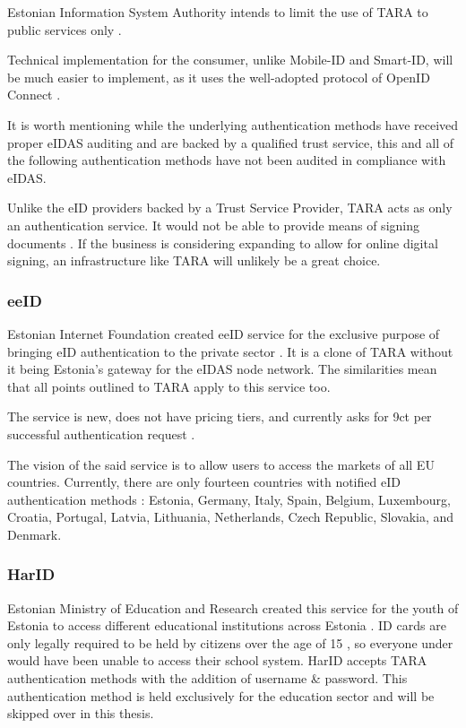 Estonian Information System Authority intends to limit the use of TARA to public services only \cite{tara-business}.

Technical implementation for the consumer, unlike Mobile-ID and Smart-ID, will be much easier to implement, as it uses the well-adopted protocol of OpenID Connect \cite{tara-technical, oidc}.

It is worth mentioning while the underlying authentication methods have received proper eIDAS auditing and are backed by a qualified trust service, this and all of the following authentication methods have not been audited in compliance with eIDAS.

Unlike the eID providers backed by a Trust Service Provider, TARA acts as only an authentication service. It would not be able to provide means of signing documents \cite{tara-technical}. If the business is considering expanding to allow for online digital signing, an infrastructure like TARA will unlikely be a great choice.

\subsubsection{eeID}

Estonian Internet Foundation created eeID service for the exclusive purpose of bringing eID authentication to the private sector \cite{eeid}. It is a clone of TARA without it being Estonia's gateway for the eIDAS node network. The similarities mean that all points outlined to TARA apply to this service too.

The service is new, does not have pricing tiers, and currently asks for 9ct per successful authentication request \cite{eeid-pricing}.

The vision of the said service is to allow users to access the markets of all EU countries. Currently, there are only fourteen countries with notified eID authentication methods \cite{eulaw-eidas-notified}: Estonia, Germany, Italy, Spain, Belgium, Luxembourg, Croatia, Portugal, Latvia, Lithuania, Netherlands, Czech Republic, Slovakia, and Denmark.

\subsubsection{HarID}

Estonian Ministry of Education and Research created this service for the youth of Estonia to access different educational institutions across Estonia \cite{harid}. ID cards are only legally required to be held by citizens over the age of 15 \cite{eelaw-idcard}, so everyone under would have been unable to access their school system. HarID accepts TARA authentication methods with the addition of username \& password. This authentication method is held exclusively for the education sector and will be skipped over in this thesis.

